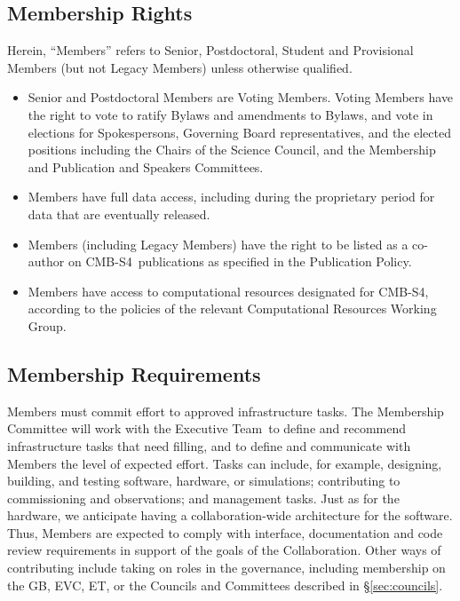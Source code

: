 \documentclass[12pt]{article}
\newcommand{\exec}{{Executive Team}}
\newcommand\collabname{CMB-S4}
\begin{document}
\subsection{Membership Rights}\label{sec:memberrights}

Herein, ``Members'' refers to Senior, Postdoctoral, Student and Provisional Members (but not Legacy Members) unless otherwise qualified.  

\begin{itemize}

\item Senior and Postdoctoral Members are Voting Members.  Voting Members  have the right to vote to ratify Bylaws and amendments to Bylaws, and vote in elections for Spokespersons, Governing Board representatives, and the elected positions including the Chairs of the Science Council, and the Membership and Publication and Speakers Committees.  %

\item Members have full data access, including during the proprietary period for data that are eventually released.

\item Members (including Legacy Members) have the right to be listed as a co-author on \collabname\ publications as specified in the Publication Policy.

\item Members have access to computational resources designated for \collabname, according to the policies of the relevant Computational Resources Working Group.

\end{itemize}

\subsection{Membership Requirements}

 Members must commit effort to approved infrastructure tasks.   
The Membership Committee will work with the \exec\ to define and recommend infrastructure tasks that need filling, 
\textcolor{\markcolor}{ and to define and communicate with Members the level of expected effort.}
Tasks can include,  for example, designing, building, and testing software, hardware, or simulations; contributing to commissioning and observations; and management tasks. 
Just as for the hardware, we anticipate having a collaboration-wide architecture for the software.  Thus, Members are expected to comply with interface, documentation and code review requirements in support of the goals of the Collaboration.   Other ways of contributing include taking on roles in the governance, including membership on the GB, EVC, ET, or the Councils and Committees described in \S\ref{sec:councils}.
\end{document}
